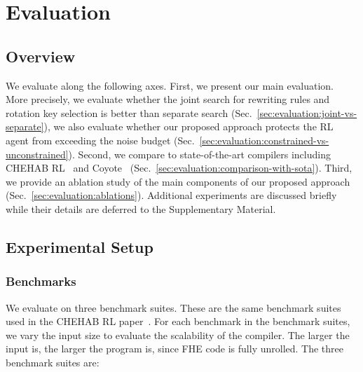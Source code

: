 \shrink[1]
\section{Evaluation \label{sec:evaluation}}


\shrink[1]
\subsection{Overview \label{sec:evaluation:overview}}


We evaluate \ToolName{} along the following axes. First, we present our main evaluation. More precisely, we evaluate whether the joint search for rewriting rules and rotation key selection is better than separate search (Sec.~\ref{sec:evaluation:joint-vs-separate}), we also evaluate whether our proposed approach protects the RL agent from exceeding the noise budget (Sec.~\ref{sec:evaluation:constrained-vs-unconstrained}). Second, we compare \ToolName{} to state-of-the-art compilers including CHEHAB RL~\cite{ChehabRL} and Coyote~\cite{Malik2023Coyote} (Sec.~\ref{sec:evaluation:comparison-with-sota}). Third, we provide an ablation study of the main components of our proposed approach (Sec.~\ref{sec:evaluation:ablations}). Additional experiments are discussed briefly while their details are deferred to the Supplementary Material.



\shrink[1]
\subsection{Experimental Setup \label{sec:evaluation:setup}}


\shrink[1]
\subsubsection{Benchmarks \label{sec:evaluation:setup:benchmarks}}

We evaluate \ToolName{} on three benchmark suites. These are the same benchmark suites used in the CHEHAB RL paper~\cite{ChehabRL}. For each benchmark in the benchmark suites, we vary the input size to evaluate the scalability of the compiler. The larger the input is, the larger the program is, since FHE code is fully unrolled. The three benchmark suites are:

